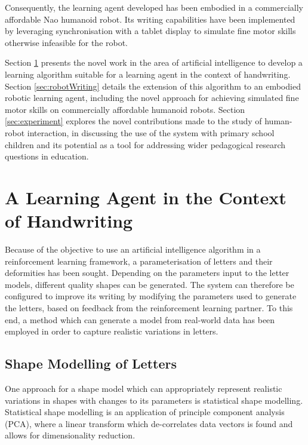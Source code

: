 \documentclass{sig-alternate}
\begin{document}
Consequently, the learning agent developed has been embodied in a commercially
affordable Nao humanoid robot. Its writing capabilities have been implemented by
leveraging synchronisation with a tablet display to simulate fine motor skills
otherwise infeasible for the robot. 

Section \ref{sec:learningAlgorithm} presents the novel work in the area of
artificial intelligence to develop a learning algorithm suitable for a learning
agent in the context of handwriting.  Section \ref{sec:robotWriting} details the
extension of this algorithm to an embodied robotic learning agent, including the
novel approach for achieving simulated fine motor skills on commercially
affordable humanoid robots.  Section \ref{sec:experiment} explores the novel
contributions made to the study of human-robot interaction, in discussing the
use of the system with primary school children and its potential as a tool for
addressing wider pedagogical research questions in education. 



\section{A Learning Agent in the Context of Handwriting} \label{sec:learningAlgorithm}

Because of the objective to use an artificial intelligence algorithm in a
reinforcement learning framework, a parameterisation of letters and their
deformities has been sought. Depending on the parameters input to the letter
models, different quality shapes can be generated. The system can therefore be
configured to improve its writing by modifying the parameters used to generate
the letters, based on feedback from the reinforcement learning partner. To this
end, a method which can generate a model from real-world data has been employed
in order to capture realistic variations in letters. 

\subsection{Shape Modelling of Letters} \label{sec:writingGeneration}

One approach for a shape model which can appropriately represent realistic
variations in shapes with changes to its parameters is statistical shape
modelling. Statistical shape modelling is an application of principle component
analysis (PCA), where a linear transform which de-correlates data vectors is
found \cite{Stegmann2002} and allows for dimensionality reduction. 
\end{document}
